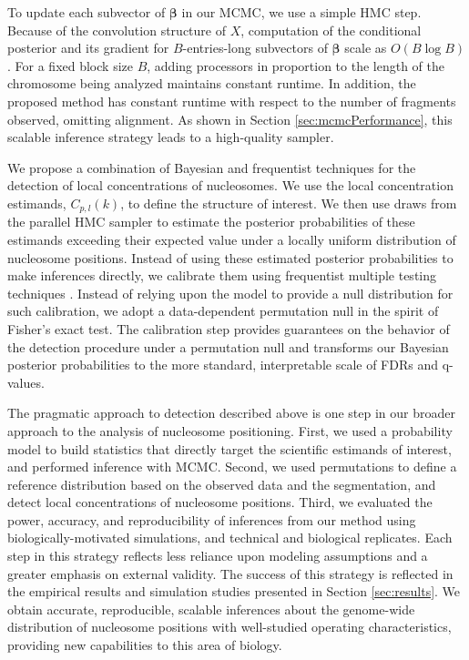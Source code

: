 To update each subvector of $\bm \beta$ in our MCMC, we use a simple HMC step.
Because of the convolution structure of $X$, computation of the conditional posterior and its gradient for $B$-entries-long subvectors of $\bm \beta$ scale as $O(B \log B)$. 
For a fixed block size $B$, adding processors in proportion to the length of the chromosome being analyzed maintains constant runtime.
In addition, the proposed method has constant runtime with respect to the number of fragments observed, omitting alignment.
As shown in Section \ref{sec:mcmcPerformance}, this scalable inference strategy leads to a high-quality sampler.


We propose a combination of Bayesian and frequentist techniques for the detection of local concentrations of nucleosomes.
We use the local concentration estimands, $C_{p,l}(k)$, to define the structure of interest.
We then use draws from the parallel HMC sampler to estimate the posterior probabilities of these estimands exceeding their expected value under a locally uniform distribution of nucleosome positions.
%
Instead of using these estimated posterior probabilities to make inferences directly, we calibrate them using frequentist multiple testing techniques \citep{StoreyTibshirani2003}.
Instead of relying upon the model to provide a null distribution for such calibration, we adopt a data-dependent permutation null in the spirit of Fisher's exact test.
%
The calibration step provides guarantees on the behavior of the detection procedure under a permutation null and transforms our Bayesian posterior probabilities to the more standard, interpretable scale of FDRs and q-values.

The pragmatic approach to detection described above is one step in our broader approach to the analysis of nucleosome positioning.
%
First, we used a probability model to build statistics that directly target the scientific estimands of interest, and performed inference with MCMC.
Second, we used permutations to define a reference distribution based on the observed data and the segmentation, and detect local concentrations of nucleosome positions.
Third, we evaluated the power, accuracy, and reproducibility of inferences from our method using biologically-motivated simulations, and technical and biological replicates.
Each step in this strategy reflects less reliance upon modeling assumptions and a greater emphasis on external validity.
%
The success of this strategy is reflected in the empirical results and simulation studies presented in Section \ref{sec:results}.
We obtain accurate, reproducible, scalable inferences about the genome-wide distribution of nucleosome positions with well-studied operating characteristics, providing new capabilities to this area of biology.

